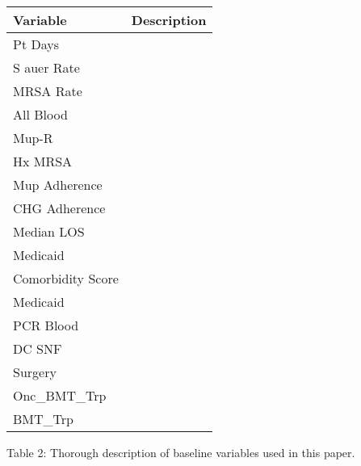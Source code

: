 \documentclass[]{sagej}
\begin{document}
\begin{longtable}[]{@{}ll@{}}
\toprule
Variable & Description\tabularnewline
\midrule
\endhead
Pt Days &\tabularnewline
S auer Rate &\tabularnewline
MRSA Rate &\tabularnewline
All Blood &\tabularnewline
Mup-R &\tabularnewline
Hx MRSA &\tabularnewline
Mup Adherence &\tabularnewline
CHG Adherence &\tabularnewline
Median LOS &\tabularnewline
Medicaid &\tabularnewline
Comorbidity Score &\tabularnewline
Medicaid &\tabularnewline
PCR Blood &\tabularnewline
DC SNF &\tabularnewline
Surgery &\tabularnewline
Onc\_BMT\_Trp &\tabularnewline
BMT\_Trp &\tabularnewline
\bottomrule
\end{longtable}

Table 2: Thorough description of baseline variables used in this paper.


\end{document}
